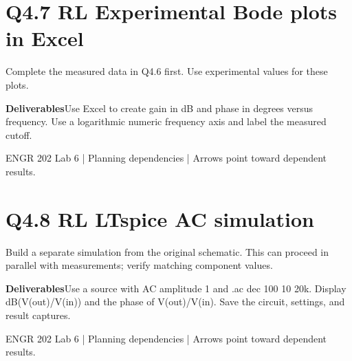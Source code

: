 \documentclass[11pt]{article}
\begin{document}
\section*{Q4.7 RL Experimental Bode plots in Excel}
Complete the measured data in Q4.6 first. Use experimental values for these plots.\par\medskip
\textbf{Deliverables}\quad Use Excel to create gain in dB and phase in degrees versus frequency. Use a logarithmic numeric frequency axis and label the measured cutoff.\par\bigskip
\begin{center}\end{center}
\vfill\small ENGR 202 Lab 6 | Planning dependencies | Arrows point toward dependent results.
\newpage
\section*{Q4.8 RL LTspice AC simulation}
Build a separate simulation from the original schematic. This can proceed in parallel with measurements; verify matching component values.\par\medskip
\textbf{Deliverables}\quad Use a source with AC amplitude 1 and .ac dec 100 10 20k. Display dB(V(out)/V(in)) and the phase of V(out)/V(in). Save the circuit, settings, and result captures.\par\bigskip
\begin{center}\end{center}
\vfill\small ENGR 202 Lab 6 | Planning dependencies | Arrows point toward dependent results.
\newpage
\end{document}
